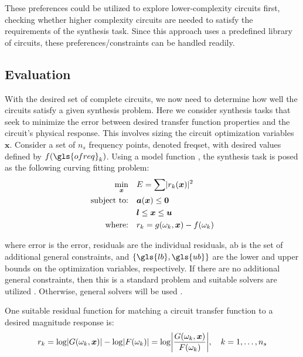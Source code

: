 These preferences could be utilized to explore lower-complexity circuits first, checking whether higher complexity circuits are needed to satisfy the requirements of the synthesis task.
Since this approach uses a predefined library of circuits, these preferences/constraints can be handled readily.

\subsection{Evaluation}

With the desired set of complete circuits, we now need to determine how well the circuits satisfy a given synthesis problem.
Here we consider synthesis tasks that seek to minimize the error between desired transfer function properties and the circuit's physical response.
This involves sizing the circuit optimization variables $\bm{x}$.
Consider a set of $n_s$ frequency points, denoted \gls{freqset}, with desired values defined by $f(\gls{ofreq}_k)$.
Using a model function , the synthesis task is posed as the following curving fitting problem:
\begin{subequations}
\label{eq:ch6:nls}
\begin{align}
\min_{\bm{x}} \quad & E = \sum \lvert r_k(\bm{x})\rvert^2 \\
\text{subject to:} \quad & \bm{a}(\bm{x}) \leq \bm{0} \label{eq:ch6:add:constraints} \\
&\bm{l}  \leq \bm{x} \leq \bm{u} \label{eq:ch6:nls:bounds} \\
\text{where:} \quad & r_k = g(\omega_k,\bm{x}) - f(\omega_k) 
\end{align}
\end{subequations}

\noindent where \gls{error} is the error, \gls{residuals} are the individual residuals, \gls{ab} is the set of additional general constraints, and $\{\gls{lb},\gls{ub}\}$ are the lower and upper bounds on the optimization variables, respectively.
If there are no additional general constraints, then this is a standard  problem and suitable solvers are utilized \cite{matlab-lsqnonlin}.
Otherwise, general  solvers will be used \cite{matlab-fmincon}.

One suitable residual function for matching a circuit transfer function to a desired magnitude response is:
\begin{align}
\label{eq:ch6:rk:1}
r_k = \log\abs{G(\omega_k, \bm{x}) } - \log\abs{F(\omega_k) } = \log\abs*{\frac{G(\omega_k, \bm{x}) }{F(\omega_k) }}, \quad k = 1,\dots,n_s
\end{align}

